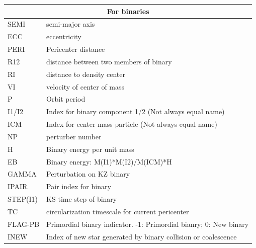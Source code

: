 \begin{longtable}{|p{0.7in}|p{4.3in}|}
    \multicolumn{2}{|c|}{ For binaries } \\\hline
    SEMI  & semi-major axis \\\hline
    ECC   & eccentricity \\\hline
    PERI  & Pericenter distance \\\hline
    R12   & distance between two members of binary \\\hline
    RI    & distance to density center \\\hline
    VI    & velocity of center of mass\\\hline
    P     & Orbit period \\\hline
    I1/I2 & Index for binary component 1/2 (Not always equal name)\\\hline
    ICM   & Index for center mass particle (Not always equal name)\\\hline
    NP    & perturber number \\\hline
    H     & Binary energy per unit mass \\\hline
    EB    & Binary energy: M(I1)*M(I2)/M(ICM)*H\\\hline
    GAMMA & Perturbation on KZ binary \\\hline
    IPAIR & Pair index for binary \\\hline
 STEP(I1) & KS time step of binary \\\hline
       TC & circularization timescale for current pericenter \\\hline

    FLAG-PB & Primordial binary indicator. -1: Primordial bianry; 0: New binary \\\hline 
    INEW    & Index of new star generated by binary collision or coalescence\\\hline
    \hline


\end{longtable}
